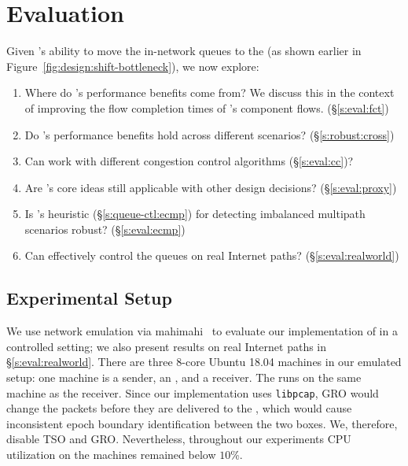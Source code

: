 \section{Evaluation}\label{s:eval}

Given \name's ability to move the in-network queues to the \inbox (as shown earlier in Figure~\ref{fig:design:shift-bottleneck}), we now explore:
\begin{enumerate}[leftmargin=15pt]
    \item Where do \name's performance benefits come from? We discuss this in the context of improving the flow completion times of \name's component flows. (\S\ref{s:eval:fct})
    \item Do \name's performance benefits hold across different scenarios? (\S\ref{s:robust:cross})
    \item Can \name work with different congestion control algorithms (\S\ref{s:eval:cc})?
    \item Are \name's core ideas still applicable with other design decisions? (\S\ref{s:eval:proxy})
    \item Is \name's heuristic (\S\ref{s:queue-ctl:ecmp}) for detecting imbalanced multipath scenarios robust? (\S\ref{s:eval:ecmp})  
    \item Can \name effectively control the queues on real Internet paths? (\S\ref{s:eval:realworld})
\end{enumerate}

\subsection{Experimental Setup}\label{s:eval:setup}

We use network emulation via mahimahi~\cite{mahimahi} to evaluate our implementation of \name in a controlled setting; we also present results on real Internet paths in \S\ref{s:eval:realworld}.
There are three $8$-core Ubuntu 18.04 machines in our emulated setup: one machine is a sender, an \inbox, and a  receiver. The \outbox runs on the same machine as the receiver.
Since our \outbox implementation uses \texttt{libpcap}, GRO would change the packets before they are delivered to the \outbox, which would cause inconsistent epoch boundary identification between the two boxes. We, therefore, disable TSO and GRO.
Nevertheless, throughout our experiments CPU utilization on the machines remained below $10$\%.

